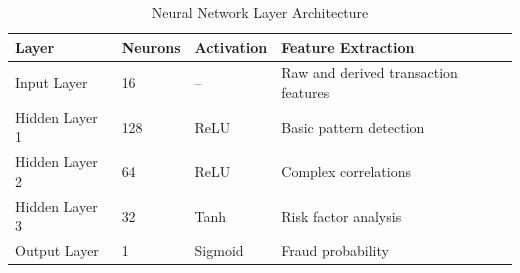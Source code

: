 \begin{table}[!htb]
\centering
\small
\begin{tabular}{|p{2.8cm}|p{2.2cm}|p{2.5cm}|p{6cm}|}
\hline
\cellcolor{lightblue!30}\textbf{Layer} & \cellcolor{lightblue!30}\textbf{Neurons} & \cellcolor{lightblue!30}\textbf{Activation} & \cellcolor{lightblue!30}\textbf{Feature Extraction} \\
\hline
Input Layer & 16 & -- & Raw and derived transaction features \\
\hline
Hidden Layer 1 & 128 & ReLU & Basic pattern detection \\
\hline
Hidden Layer 2 & 64 & ReLU & Complex correlations \\
\hline
Hidden Layer 3 & 32 & Tanh & Risk factor analysis \\
\hline
Output Layer & 1 & Sigmoid & Fraud probability \\
\hline
\end{tabular}
\caption{Neural Network Layer Architecture}
\label{tab:nn_layers}
\end{table}